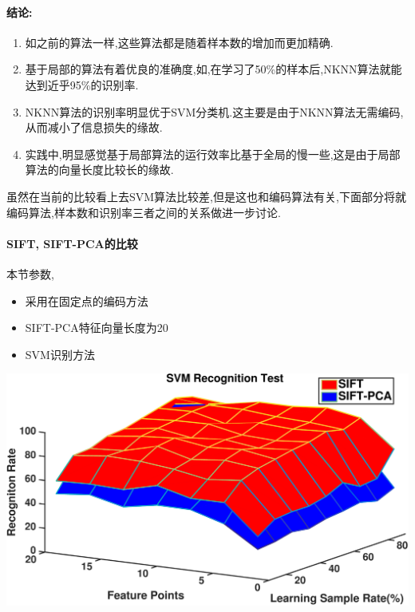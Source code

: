 \paragraph{结论:}
\begin{enumerate}
	\item 如之前的算法一样,这些算法都是随着样本数的增加而更加精确.
	\item 基于局部的算法有着优良的准确度,如,在学习了50\%的样本后,NKNN算法就能达到近乎95\%的识别率.
	\item NKNN算法的识别率明显优于SVM分类机.这主要是由于NKNN算法无需编码,从而减小了信息损失的缘故.
	\item 实践中,明显感觉基于局部算法的运行效率比基于全局的慢一些,这是由于局部算法的向量长度比较长的缘故.
\end{enumerate}

虽然在当前的比较看上去SVM算法比较差,但是这也和编码算法有关,下面部分将就编码算法,样本数和识别率三者之间的关系做进一步讨论.

\paragraph{SIFT, SIFT-PCA的比较}本节参数,
\begin{itemize}
	\item 采用在固定点的编码方法
	\item SIFT-PCA特征向量长度为20
	\item SVM识别方法
\end{itemize}

		\begin{center}
		\begin{minipage}[t]{\linewidth}
		\center
		{
		\includegraphics[width=\textwidth]{Img/c3/sift_sift_pca_svm} 
		}
		\end{minipage}
		\medskip
		\end{center}
	
